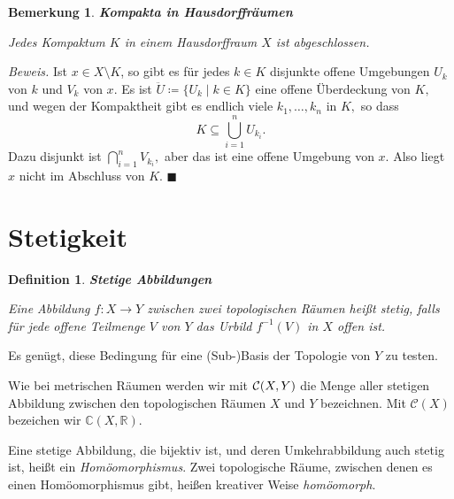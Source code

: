 \documentclass[12pt]{scrbook}   %
\newtheorem{bemX}[alles]{Bemerkung}
\newenvironment{bem}[1]{\begin{bemX}{\bf #1}\par\rm}{\end{bemX}}
\newtheorem{definiX}[alles]{Definition}
\newenvironment{defini}[1]{\begin{definiX}{\bf #1}\par\rm}{\end{definiX}}
\newcommand{\qed}{\phantom{.}\hfill{$\blacksquare$}}
\newcommand{\da}{\coloneqq}
\begin{document}
\begin{bem}{Kompakta in Hausdorffräumen}
\label{fuer Liouville}
Jedes Kompaktum $K$ in einem Hausdorffraum $X$ ist abgeschlossen.
\end{bem}

{\it Beweis.} 
Ist $x\in X\setminus K$, so gibt es für jedes $k\in K$ disjunkte
offene Umgebungen $U_k$ von $k$ und $V_k$ von $x$. Es ist $\ddot U \da \{ U_k\mid k\in K\}$ eine offene Überdeckung von $K,$ und wegen der Kompaktheit 
gibt es endlich viele $k_1,\dots ,k_n$ in $K,$ so dass 
$$K \subseteq \bigcup_{i=1}^n U_{k_i}.$$
Dazu disjunkt ist $\bigcap_{i=1}^n V_{k_i},$ aber das ist eine offene Umgebung
von $x$. Also liegt $x$ nicht im Abschluss von $K.$
\qed

\section{Stetigkeit}

\begin{defini}{Stetige Abbildungen}
Eine Abbildung $f:X\longrightarrow Y$ zwischen zwei topologischen Räumen
heißt {\it stetig}, falls für jede offene Teilmenge $V$
von $Y$ das Urbild $f^{-1}(V)$ in $X$ offen ist.
\end{defini}

Es genügt, diese Bedingung für eine (Sub-)Basis der Topologie von $Y$ zu testen.

Wie bei metrischen Räumen werden wir mit ${\cal C}(X,Y)$ die Menge aller 
stetigen Abbildung zwischen den topologischen Räumen $X$ und $Y$ bezeichnen. Mit $\mathcal C(X)$ bezeichen wir $\mathbb C(X,\mathbb R)$.

Eine stetige Abbildung, die bijektiv ist, und deren Umkehrabbildung auch
stetig ist, heißt ein {\it Homöomorphismus}. Zwei topologische Räume,
zwischen denen es einen Homöomorphismus gibt, heißen kreativer Weise
{\it homöomorph}.
\end{document}
